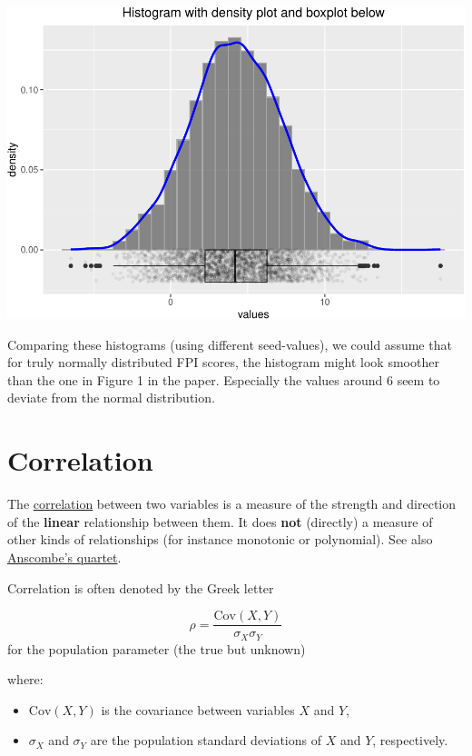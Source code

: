 \documentclass[
]{book}
\newcommand{\pandocbounded}[1]{#1}
\begin{document}
\pandocbounded{\includegraphics[keepaspectratio]{_main_files/figure-latex/unnamed-chunk-21-1.pdf}}

Comparing these histograms (using different seed-values), we could assume that for truly normally distributed
FPI scores, the histogram might look smoother than the one in Figure 1 in the paper. Especially the values around 6
seem to deviate from the normal distribution.

\section{Correlation}\label{correlation}

The \href{https://en.wikipedia.org/wiki/Correlation}{correlation} between two variables is a measure
of the strength and direction of the \textbf{linear} relationship between them. It does \textbf{not} (directly)
a measure of other kinds of relationships (for instance monotonic or polynomial).
See also \href{https://en.wikipedia.org/wiki/Anscombe\%27s_quartet}{Anscombe's quartet}.

Correlation is often denoted by the Greek letter

\[\rho = \frac{\text{Cov}(X, Y)}{\sigma_X \sigma_Y}\]
for the population parameter (the true but unknown)

where:

\begin{itemize}
\item
  \(\text{Cov}(X, Y)\) is the covariance between variables \(X\) and \(Y\),
\item
  \(\sigma_X\) and \(\sigma_Y\) are the population standard deviations of \(X\) and \(Y\), respectively.
\end{itemize}
\end{document}
